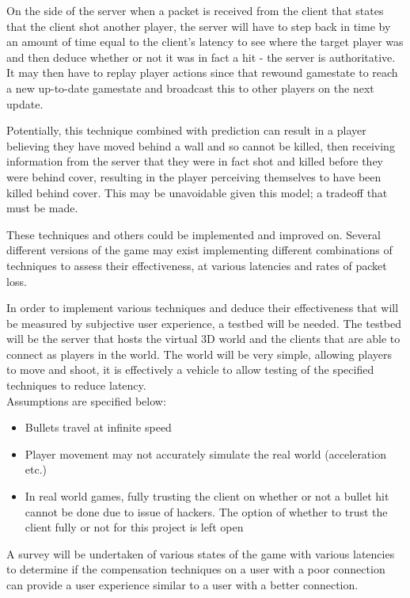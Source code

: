 \documentclass{article}
\begin{document}
	On the side of the server when a packet is received from the client that states that the client shot another player, the server will have to step back in time by an amount of time equal to the client's latency to see where the target player was and then deduce whether or not it was in fact a hit - the server is authoritative. It may then have to replay player actions since that rewound gamestate to reach a new up-to-date gamestate and broadcast this to other players on the next update.

	Potentially, this technique combined with prediction can result in a player believing they have moved behind a wall and so cannot be killed, then receiving information from the server that they were in fact shot and killed before they were behind cover, resulting in the player perceiving themselves to have been killed behind cover. This may be unavoidable given this model; a tradeoff that must be made.

	These techniques and others could be implemented and improved on. Several different versions of the game may exist implementing different combinations of techniques to assess their effectiveness, at various latencies and rates of packet loss.

	In order to implement various techniques and deduce their effectiveness that will be measured by subjective user experience, a testbed will be needed. The testbed will be the server that hosts the virtual 3D world and the clients that are able to connect as players in the world. The world will be very simple, allowing players to move and shoot, it is effectively a vehicle to allow testing of the specified techniques to reduce latency.\\

	Assumptions are specified below:
	\begin{itemize}
		\item Bullets travel at infinite speed
		\item Player movement may not accurately simulate the real world (acceleration etc.)
		\item In real world games, fully trusting the client on whether or not a bullet hit cannot be done due to issue of hackers. The option of whether to trust the client fully or not for this project is left open
	\end{itemize}

	A survey will be undertaken of various states of the game with various latencies to determine if the compensation techniques on a user with a poor connection can provide a user experience similar to a user with a better connection.
\end{document}
